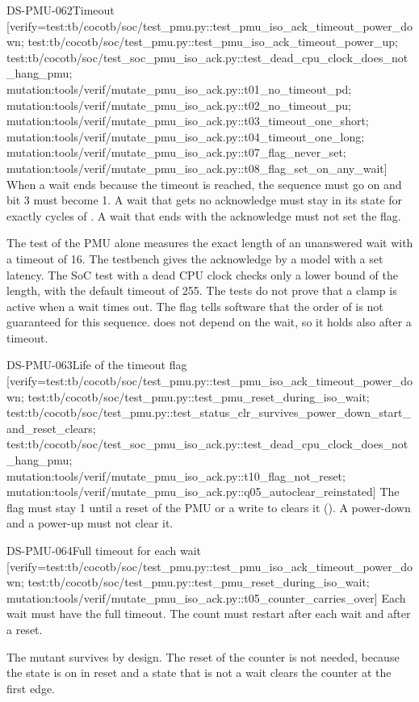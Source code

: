 \begin{requirement}{DS-PMU-062}{Timeout}
[verify={test:tb/cocotb/soc/test_pmu.py::test_pmu_iso_ack_timeout_power_down; test:tb/cocotb/soc/test_pmu.py::test_pmu_iso_ack_timeout_power_up; test:tb/cocotb/soc/test_soc_pmu_iso_ack.py::test_dead_cpu_clock_does_not_hang_pmu; mutation:tools/verif/mutate_pmu_iso_ack.py::t01_no_timeout_pd; mutation:tools/verif/mutate_pmu_iso_ack.py::t02_no_timeout_pu; mutation:tools/verif/mutate_pmu_iso_ack.py::t03_timeout_one_short; mutation:tools/verif/mutate_pmu_iso_ack.py::t04_timeout_one_long; mutation:tools/verif/mutate_pmu_iso_ack.py::t07_flag_never_set; mutation:tools/verif/mutate_pmu_iso_ack.py::t08_flag_set_on_any_wait}]
When a wait ends because the timeout is reached, the sequence must go on and  bit 3 must become 1. A wait that gets no acknowledge must stay in its state for exactly  cycles of . A wait that ends with the acknowledge must not set the flag.
\end{requirement}
\begin{information}
The test of the PMU alone measures the exact length of an unanswered wait with a timeout of 16. The testbench gives the acknowledge by a model with a set latency. The SoC test with a dead CPU clock checks only a lower bound of the length, with the default timeout of 255. The tests do not prove that a clamp is active when a wait times out. The flag tells software that the order of  is not guaranteed for this sequence.  does not depend on the wait, so it holds also after a timeout.
\end{information}

\begin{requirement}{DS-PMU-063}{Life of the timeout flag}
[verify={test:tb/cocotb/soc/test_pmu.py::test_pmu_iso_ack_timeout_power_down; test:tb/cocotb/soc/test_pmu.py::test_pmu_reset_during_iso_wait; test:tb/cocotb/soc/test_pmu.py::test_status_clr_survives_power_down_start_and_reset_clears; test:tb/cocotb/soc/test_soc_pmu_iso_ack.py::test_dead_cpu_clock_does_not_hang_pmu; mutation:tools/verif/mutate_pmu_iso_ack.py::t10_flag_not_reset; mutation:tools/verif/mutate_pmu_iso_ack.py::q05_autoclear_reinstated}]
The flag  must stay 1 until a reset of the PMU or a write to  clears it (). A power-down and a power-up must not clear it.
\end{requirement}

\begin{requirement}{DS-PMU-064}{Full timeout for each wait}
[verify={test:tb/cocotb/soc/test_pmu.py::test_pmu_iso_ack_timeout_power_down; test:tb/cocotb/soc/test_pmu.py::test_pmu_reset_during_iso_wait; mutation:tools/verif/mutate_pmu_iso_ack.py::t05_counter_carries_over}]
Each wait must have the full timeout. The count must restart after each wait and after a reset.
\end{requirement}
\begin{information}
The mutant  survives by design. The reset of the counter is not needed, because the state is on in reset and a state that is not a wait clears the counter at the first edge.
\end{information}

